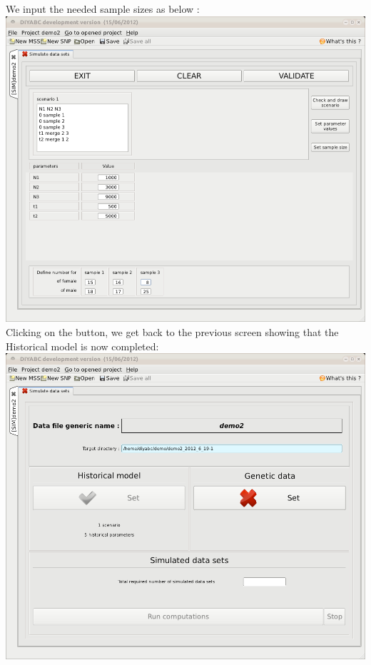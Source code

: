 We input the needed sample sizes as below :\\

\includegraphics[scale=0.33]{gui_pictures/Capture-DIYABC-69.png} \\

Clicking on the  button, we get back to the previous screen showing that the Historical model is now completed:\\

\includegraphics[scale=0.33]{gui_pictures/Capture-DIYABC-70.png} \\



